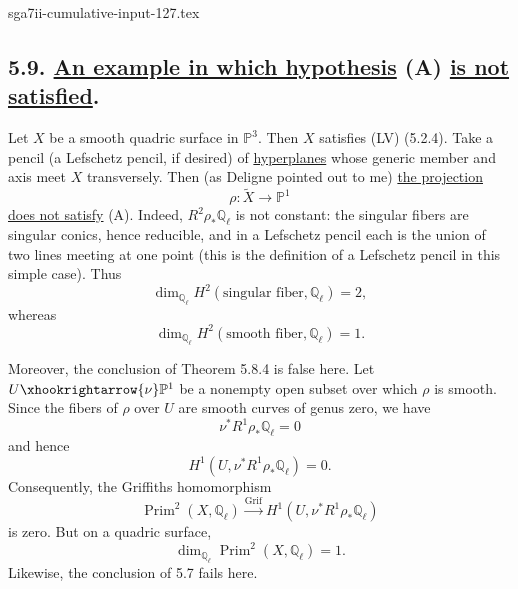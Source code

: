 \begin{filecontents*}{sga7ii-cumulative-input-127.tex}
\subsection*{5.9. \underline{An example in which hypothesis} (A)
\underline{is not satisfied}.}

Let $X$ be a smooth quadric surface in $\mathbb P^3$.  Then $X$ satisfies
(LV) (5.2.4).  Take a pencil (a Lefschetz pencil, if desired) of
\underline{hyperplanes} whose generic member and axis meet $X$
transversely.  Then (as Deligne pointed out to me) \underline{the projection}
\[
\rho:\widetilde X\longrightarrow\mathbb P^1
\]
\underline{does not satisfy} (A).  Indeed,
$R^2\rho_*\mathbb Q_\ell$ is not constant: the singular fibers are singular
conics, hence reducible, and in a Lefschetz pencil each is the union of two
lines meeting at one point (this is the definition of a Lefschetz pencil in
this simple case).  Thus
\[
\dim_{\mathbb Q_\ell}H^2(\text{singular fiber},\mathbb Q_\ell)=2,
\]
whereas
\[
\dim_{\mathbb Q_\ell}H^2(\text{smooth fiber},\mathbb Q_\ell)=1.
\]

Moreover, the conclusion of Theorem 5.8.4 is false here.  Let
$U\xhookrightarrow{\nu}\mathbb P^1$ be a nonempty open subset over which
$\rho$ is smooth.  Since the fibers of $\rho$ over $U$ are smooth curves of
genus zero, we have
\[
\nu^*R^1\rho_*\mathbb Q_\ell=0
\]
and hence
\[
H^1(U,\nu^*R^1\rho_*\mathbb Q_\ell)=0.
\]
Consequently, the Griffiths homomorphism
\[
\operatorname{Prim}^2(X,\mathbb Q_\ell)
\xrightarrow{\operatorname{Grif}}
H^1(U,\nu^*R^1\rho_*\mathbb Q_\ell)
\]
is zero.  But on a quadric surface,
\[
\dim_{\mathbb Q_\ell}\operatorname{Prim}^2(X,\mathbb Q_\ell)=1.
\]
Likewise, the conclusion of 5.7 fails here.
\end{filecontents*}
